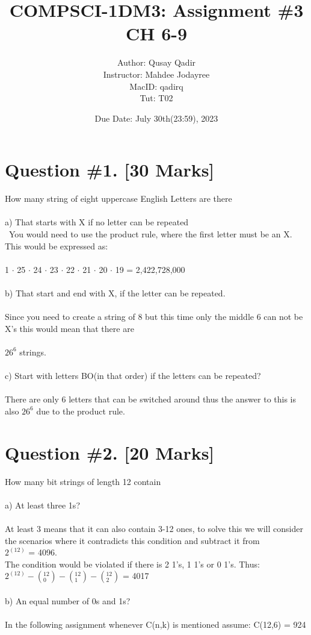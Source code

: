 \documentclass{article}
\title{
\LARGE COMPSCI-1DM3: Assignment \#3 CH 6-9 \\
}
\author{\Large Author: Qusay Qadir \\
\large Instructor: Mahdee Jodayree\\MacID: qadirq  \\Tut: T02 \\ }
\date{Due Date: July 30th(23:59), 2023}
\begin{document}
\maketitle
\newpage
\tableofcontents
\newpage

\section{Question \#1. [30 Marks]}
How many string of eight uppercase English Letters are there \\\\
a) That starts with X if no letter can be repeated \\\
You would need to use the product rule, where the first letter must be an X. This would be expressed as: \\\\
1 $\cdot$ 25 $\cdot$ 24 $\cdot$ 23 $\cdot$ 22 $\cdot$ 21 $\cdot$ 20 $\cdot$ 19 = 2,422,728,000 \\\\
b) That start and end with X, if the letter can be repeated.  \\\\
Since you need to create a string of 8 but this time only the middle 6 can not be X's this would mean that there are \\\\
$26^6$ strings. \\\\
c) Start with letters BO(in that order) if the letters can be repeated? \\\\
There are only 6 letters that can be switched around thus the answer to this is also $26^6$ due to the product rule.
\newpage
\section{Question \#2. [20 Marks]}
How many bit strings of length 12 contain \\ \\
a) At least three 1s? \\\\
At least 3 means that it can also contain 3-12 ones, to solve this we will consider the scenarios where it contradicts this condition and subtract it from \\ $2^{(12)}$  = 4096.
 \\The condition would be violated if there is 2 1's, 1 1's or 0 1's. 
 Thus: \\$2^{(12)} -  (_{0}^{12}) -  (_{1}^{12}) -  (_{2}^{12})$ = 4017 \\\\
 b) An equal number of 0s and 1s? \\\\
 In the following assignment whenever C(n,k) is mentioned assume: 
 \equation{}
 \equation{}
 C(12,6) = 924
\end{document}
